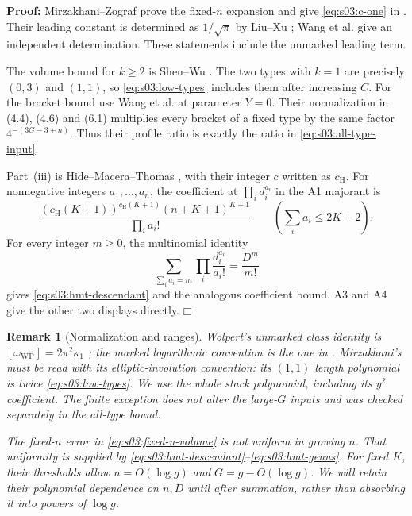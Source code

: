 \documentclass[a4paper,10pt]{article}
\numberwithin{equation}{section}
\theoremstyle{paperplain}
\theoremstyle{paperremark}
\newtheorem{rmk}{Remark}[section]
\theoremstyle{paperplain}
\newenvironment{prf}{\noindent \textbf{Proof: }}{\hfill $\mdlgwhtsquare$\par\addvspace{0.5\baselineskip}}
\begin{document}
\begin{prf}
Mirzakhani--Zograf prove the fixed-$n$ expansion and give
\eqref{eq:s03:c-one} in \cite[Theorem~1.2 and Remark~1.3]{MZ15}.
Their leading constant is determined as $1/\sqrt\pi$ by Liu--Xu
\cite[Corollary~1.2]{LX26}; Wang et al.
\cite[Corollary~1.2]{W26} give an independent determination.
These statements include the unmarked leading term.

The volume bound for $k\geq2$ is Shen--Wu
\cite[Lemma~18]{SW25}. The two types with $k=1$ are precisely
$(0,3)$ and $(1,1)$, so \eqref{eq:s03:low-types} includes them after
increasing $C$. For the bracket bound use Wang et al.
\cite[Lemma~6.1, (6.7)]{W26} at parameter $Y=0$. Their
normalization in (4.4), (4.6) and (6.1) multiplies every bracket of a
fixed type by the same factor $4^{-(3G-3+n)}$. Thus their profile ratio
is exactly the ratio in \eqref{eq:s03:all-type-input}.

Part~\textup{(iii)} is Hide--Macera--Thomas
\cite[Theorem~4.2, A1, A3, A4]{HMT25}, with their integer $c$ written
as $c_{\mathrm H}$. For nonnegative integers $a_1,\ldots,a_n$,
the coefficient at $\prod_i d_i^{a_i}$ in the A1 majorant is
\[
\frac{(c_{\mathrm H}(K+1))^{c_{\mathrm H}(K+1)}(n+K+1)^{K+1}}
     {\prod_i a_i!}
\qquad\left(\sum_i a_i\leq2K+2\right).
\]
For every integer $m\geq0$, the multinomial identity
\[
\sum_{\sum_i a_i=m}\prod_i\frac{d_i^{a_i}}{a_i!}=\frac{D^m}{m!}
\]
gives \eqref{eq:s03:hmt-descendant} and the analogous coefficient
bound. A3 and A4 give the other two displays directly.
\end{prf}

\begin{rmk}[Normalization and ranges]
Wolpert's unmarked class identity is
$[\omega_{\mathrm{WP}}]=2\pi^2\kappa_1$
\cite[Section~5.1, p.~138]{Wol86}; the marked logarithmic convention
is the one in \cite[Section~2]{MZ15}. Mirzakhani's
\cite[Theorem~4.4 and the discussion on p.~4]{Mir07} must be read
with its elliptic-involution convention: its $(1,1)$ length polynomial
is twice \eqref{eq:s03:low-types}. We use the whole stack polynomial,
including its $y^2$ coefficient. The finite exception does not alter the
large-$G$ inputs and was checked separately in the all-type bound.

The fixed-$n$ error in \eqref{eq:s03:fixed-n-volume} is not uniform
in growing $n$. That uniformity is supplied by
\eqref{eq:s03:hmt-descendant}--\eqref{eq:s03:hmt-genus}.
For fixed $K$, their thresholds allow $n=O(\log g)$ and
$G=g-O(\log g)$. We will retain their polynomial dependence on $n,D$
until after summation, rather than absorbing it into powers of $\log g$.
\end{rmk}
\end{document}
